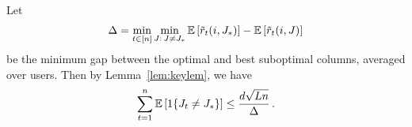  Let
\begin{align*}
  \Delta =
  \min_{t \in [n]} \min_{J:\, J \neq J_\ast} \mathbb{E}\left[\tilde{r}_t(i, J_\ast)\right] - \mathbb{E}\left[\tilde{r}_t(i, J)\right]
\end{align*}
be the minimum gap between the optimal and best suboptimal columns, averaged over users. Then by Lemma~\ref{lem:keylem}, we have
\begin{align*}
  \sum_{t = 1}^n \mathbb{E}\left[1\{J_t \neq J_\ast\}\right] \leq
  \frac{d \sqrt{L n}}{\Delta}\,.
\end{align*}
